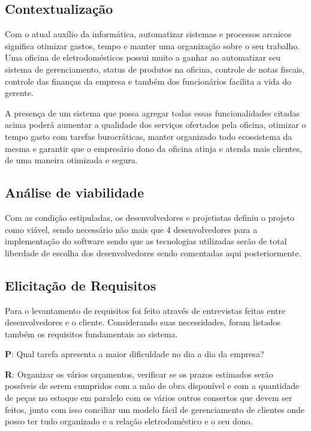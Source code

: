 \documentclass[a4paper,10pt]{article}
\begin{document}
\subsection{Contextualização}

Com o atual auxílio da informática, automatizar sistemas e processos arcaicos significa otimizar gastos, tempo e manter uma organização sobre o seu trabalho. Uma oficina de eletrodomésticos possui muito a ganhar ao automatizar seu sistema de gerenciamento, status de produtos na oficina, controle de notas fiscais, controle das finanças da empresa e também dos funcionários facilita a vida do gerente. 

A presença de um sistema que possa agregar todas essas funcionalidades citadas acima poderá aumentar a qualidade dos serviços ofertados pela oficina, otimizar o tempo gasto com tarefas burocráticas, manter organizado todo ecossistema da mesma e garantir que o empresário dono da oficina atinja e atenda mais clientes, de uma maneira otimizada e segura. 

\subsection{Análise de viabilidade}

Com as condição estipuladas, os desenvolvedores e projetistas definiu o projeto como viável, sendo necessário não mais que 4 desenvolvedores para a implementação do software sendo que as tecnologias utilizadas serão de total liberdade de escolha dos desenvolvedores sendo comentadas aqui posteriormente.

\subsection{Elicitação de Requisitos}

Para o levantamento de requisitos foi feito através de entrevistas feitas entre desenvolvedores e o cliente. Considerando suas necessidades, foram listados também os requisitos fundamentais ao sistema.

\begin{framed}

\textbf{P}: Qual tarefa apresenta a maior dificuldade no dia a dia da empresa?

\textbf{R}: Organizar os vários orçamentos, verificar se os prazos estimados serão possíveis de serem cumpridos com a mão de obra disponível e com a quantidade de peças no estoque em paralelo com os vários outros consertos que devem ser feitos, junto com isso conciliar um modelo fácil de gerenciamento de clientes onde posso ter tudo organizado e a relação eletrodoméstico e o seu dono.
\end{framed}
\end{document}
